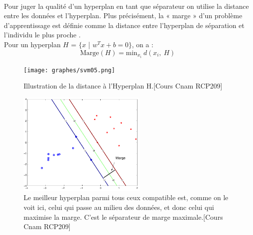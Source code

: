 \documentclass[a4paper,12pt,titlepage]{report}
\begin{document}
\paragraph{}
Pour juger la qualité d’un hyperplan en tant que séparateur on utilise la distance entre les données et l'hyperplan. Plus précisément, la « marge » d’un problème d'apprentissage est définie comme la distance entre l’hyperplan de séparation et l'individu le plus proche . \\
Pour un hyperplan $H$ = $\{x$ | $w^T x + b =0\}$, on a :
\[
\text{Marge}(H) = \text{min}_{x_{i}}\ d(x_i,\ H)
\]
\begin{figure}[!h]
	\begin{center}
	\centering	
		\texttt{[image: graphes/svm05.png]}
		\caption{Illustration de la distance à l'Hyperplan H.[Cours Cnam RCP209] }
	\end{center}
\end{figure}
\begin{figure}[!h]
	\begin{center}
	\centering	
		\includegraphics[height =5cm, keepaspectratio]{graphes/svm04.png}
		\caption{Le meilleur hyperplan parmi tous ceux compatible est, comme on le voit ici, celui qui passe au \og milieu \fg des données, et donc celui qui maximise la marge. C'est le séparateur de marge maximale.[Cours Cnam RCP209]}
	\end{center}
\end{figure}
\end{document}
